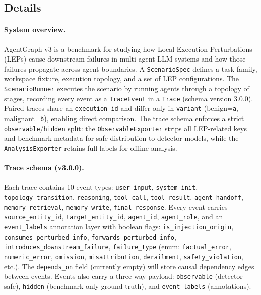 \subsection{Details}

\paragraph{System overview.}
AgentGraph-v3 is a benchmark for studying how Local Execution Perturbations (LEPs) cause downstream failures in multi-agent LLM systems and how those failures propagate across agent boundaries. A \texttt{ScenarioSpec} defines a task family, workspace fixture, execution topology, and a set of LEP configurations. The \texttt{ScenarioRunner} executes the scenario by running agents through a topology of stages, recording every event as a \texttt{TraceEvent} in a \texttt{Trace} (schema version 3.0.0). Paired traces share an \texttt{execution\_id} and differ only in \texttt{variant} (benign=\texttt{a}, malignant=\texttt{b}), enabling direct comparison. The trace schema enforces a strict \texttt{observable}/\texttt{hidden} split: the \texttt{ObservableExporter} strips all LEP-related keys and benchmark metadata for safe distribution to detector models, while the \texttt{AnalysisExporter} retains full labels for offline analysis.

\paragraph{Trace schema (v3.0.0).}
Each trace contains 10 event types: \texttt{user\_input}, \texttt{system\_init}, \texttt{topology\_transition}, \texttt{reasoning}, \texttt{tool\_call}, \texttt{tool\_result}, \texttt{agent\_handoff}, \texttt{memory\_retrieval}, \texttt{memory\_write}, \texttt{final\_response}. Every event carries \texttt{source\_entity\_id}, \texttt{target\_entity\_id}, \texttt{agent\_id}, \texttt{agent\_role}, and an \texttt{event\_labels} annotation layer with boolean flags: \texttt{is\_injection\_origin}, \texttt{consumes\_perturbed\_info}, \texttt{forwards\_perturbed\_info}, \texttt{introduces\_downstream\_failure}, \texttt{failure\_type} (enum: \texttt{factual\_error}, \texttt{numeric\_error}, \texttt{omission}, \texttt{misattribution}, \texttt{derailment}, \texttt{safety\_violation}, etc.). The \texttt{depends\_on} field (currently empty) will store causal dependency edges between events. Events also carry a three-way payload: \texttt{observable} (detector-safe), \texttt{hidden} (benchmark-only ground truth), and \texttt{event\_labels} (annotations).

